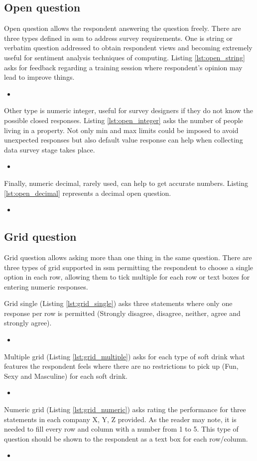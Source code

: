 \documentclass{article}
\newcommand{\insertcode}[3]{\begin{itemize}\item[]\end{itemize}} %
\begin{document}
	\subsection{Open question}
	Open question allows the respondent answering the question freely. There are three types defined in \gls{ssm} to address survey requirements. One is string or verbatim question addressed to obtain respondent views and becoming extremely useful for sentiment analysis techniques of computing. Listing \ref{lst:open_string} asks for feedback regarding a training session where respondent's opinion may lead to improve things.
\insertcode{"scripts/open_string.xml"}{Verbatim question example}{lst:open_string}
Other type is numeric integer, useful for survey designers if they do not know the possible closed responses. Listing \ref{lst:open_integer} asks the number of people living in a property. Not only min and max limits could be imposed to avoid unexpected responses but also default value response can help when collecting data survey stage takes place.
\insertcode{"scripts/open_integer.xml"}{Numeric integer question example}{lst:open_integer}
Finally, numeric decimal, rarely used, can help to get accurate numbers. Listing \ref{lst:open_decimal} represents a decimal open question.
\insertcode{"scripts/open_decimal.xml"}{Numeric decimal question example}{lst:open_decimal}
	\subsection{Grid question}
	Grid question allows asking more than one thing in the same question. There are three types of grid supported in \gls{ssm} permitting the respondent to choose a single option in each row, allowing them to tick multiple for each row or text boxes for entering numeric responses.

Grid single (Listing \ref{lst:grid_single}) asks three statements where only one response per row is permitted (Strongly disagree, disagree, neither, agree and strongly agree).
\insertcode{"scripts/grid_single.xml"}{Grid single question example}{lst:grid_single}
Multiple grid (Listing \ref{lst:grid_multiple}) asks for each type of soft drink what features the respondent feels where there are no restrictions to pick up (Fun, Sexy and Masculine) for each soft drink.
\insertcode{"scripts/grid_multiple.xml"}{Grid multiple question example}{lst:grid_multiple}
Numeric grid (Listing \ref{lst:grid_numeric}) asks rating the performance for three statements in each company X, Y, Z provided. As the reader may note, it is needed to fill every row and column with a number from 1 to 5. This type of question should be shown to the respondent as a text box for each row/column.
\insertcode{"scripts/grid_numeric.xml"}{Grid numeric question example}{lst:grid_numeric}
\end{document}
